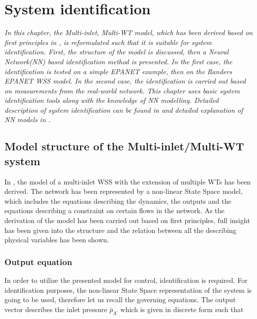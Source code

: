 \chapter{System identification}
\label{identification_design}

\emph{In this chapter, the Multi-inlet, Multi-WT model, which has been derived based on first principles in , is reformulated such that it is suitable for system identification. First, the structure of the model is discussed, then a Neural Network(NN) based identification method is presented. In the first case, the identification is tested on a simple EPANET example, then on the Randers EPANET WSS model. In the second case, the identification is carried out based on measurements from the real-world network. 
\newline
This chapter uses basic system identification tools along with the knowledge of NN modelling. Detailed description of system identification can be found in  and detailed explanation of NN models in .}

\section{Model structure of the Multi-inlet/Multi-WT system}
\label{model_structure_of_the_multi_inlet_multi_WT_system}

In , the model of a multi-inlet WSS with the extension of multiple WTs has been derived. The network has been represented by a non-linear State Space model, which includes the equations describing the dynamics, the outputs and the equations describing a constraint on certain flows in the network. As the derivation of the model has been carried out based on first principles, full insight has been given into the structure and the relation between all the describing physical variables has been shown. 

\subsection{Output equation}
\label{output_eq_identification}

In order to utilize the presented model for control, identification is required. For identification purposes, the non-linear State Space representation of the system is going to be used, therefore let us recall the governing equations. The output vector describes the inlet pressure $\bar{p}_{\mathcal{K}}$ which is given in discrete form such that

